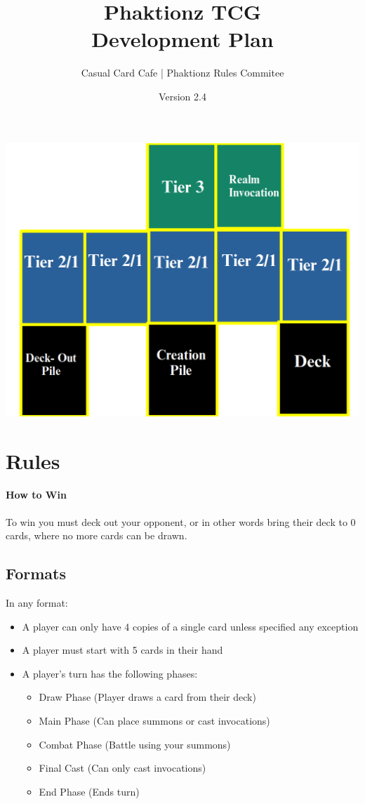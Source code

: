 \documentclass[12pt, letterpaper]{article}
\title{Phaktionz TCG \\Development Plan}
\author{Casual Card Cafe | Phaktionz Rules Commitee}
\date{Version 2.4}
\begin{document}
\maketitle
{}
\newpage
\tableofcontents
\newpage
\begin{center}
    \includegraphics[scale = 0.25]{images/field.png}
\end{center}


\section{Rules}
\paragraph{How to Win\\}
To win you must deck out your opponent, or in other words bring their deck to 0 cards, where no more cards can be drawn.
\subsection{Formats}
In any format: 
\begin{itemize}
    \item A player can only have 4 copies of a single card unless specified any exception
    \item A player must start with 5 cards in their hand 
    \item A player's turn has the following phases:
     \begin{itemize}
        \item Draw Phase (Player draws a card from their deck)
        \item Main Phase (Can place summons or cast invocations)
        \item Combat Phase (Battle using your summons)
        \item Final Cast (Can only cast invocations)
        \item End Phase (Ends turn)
     \end{itemize}
\end{itemize}
\end{document}
